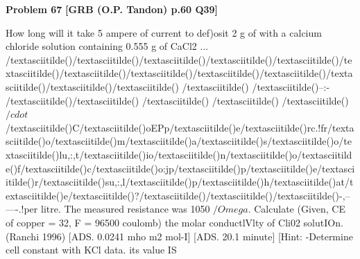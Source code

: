 \begin{problembox}
\textbf{Problem 67} \hfill \textbf{[GRB (O.P. Tandon) p.60 Q39]}
\label{q:ext-grb_all_questions-67}

How long will it take 5 ampere of current to def)osit 2 g of 
with a calcium chloride solution containing 0.555 g of CaCl2 
... 
/textasciitilde()/textasciitilde()/textasciitilde()/textasciitilde()/textasciitilde()/textasciitilde()/textasciitilde()/textasciitilde()/textasciitilde()/textasciitilde()/textasciitilde()/textasciitilde()\underline{\hspace{1cm}}/textasciitilde() 
\underline{\hspace{1cm}} /textasciitilde() \underline{\hspace{1cm}} 
/textasciitilde()--:-\underline{\hspace{1cm}} /textasciitilde()/textasciitilde() 
\underline{\hspace{1cm}} /textasciitilde() \underline{\hspace{1cm}} /textasciitilde() \underline{\hspace{1cm}} 
/textasciitilde()$/cdot$/textasciitilde()C/textasciitilde()oEPp/textasciitilde()e/textasciitilde()rc.!fr/textasciitilde()o/textasciitilde()m/textasciitilde()a/textasciitilde()s/textasciitilde()o/textasciitilde()lu,:,t/textasciitilde()io/textasciitilde()n/textasciitilde()o/textasciitilde()f/textasciitilde()c/textasciitilde()o:jp/textasciitilde()p/textasciitilde()e/textasciitilde()r/textasciitilde()su,:,l/textasciitilde()p/textasciitilde()h/textasciitilde()at/textasciitilde()e/textasciitilde()?/textasciitilde()/textasciitilde()/textasciitilde()\underline{\hspace{1cm}}-,--\underline{\hspace{1cm}} ----.!per litre. The measured resistance was 1050 $/Omega$. Calculate 
(Given, CE of copper = 32, F = 96500 coulomb) 
the molar conductlVlty of Cli02 solutIOn. 
(Ranchi 1996) 
[ADS. 
0.0241 mho m2 mol-I] 
[ADS. 
20.1 minute] 
[Hint: -Determine cell constant with KCl data. its value IS
\end{problembox}

